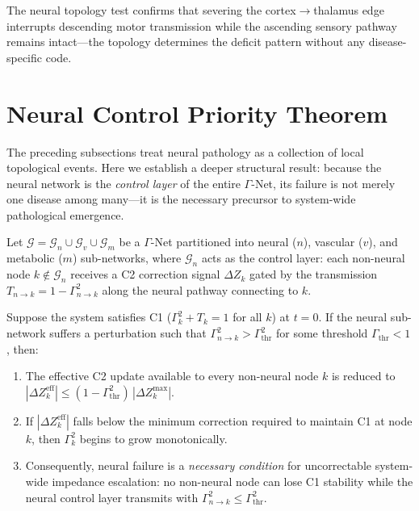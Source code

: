 \documentclass[aps,pre,twocolumn,superscriptaddress,floatfix]{revtex4-2}
\begin{document}
The neural topology test confirms that severing the
cortex$\to$thalamus edge interrupts descending motor
transmission while the ascending sensory pathway
remains intact---the topology determines the deficit
pattern without any disease-specific code.


\section{Neural Control Priority Theorem}
\label{sec:neural-control-priority}

The preceding subsections treat neural pathology as a
collection of local topological events.
Here we establish a deeper structural result: because the
neural network is the \emph{control layer} of the entire
$\Gamma$-Net, its failure is not merely one disease among
many---it is the necessary precursor to system-wide
pathological emergence.

\begin{theorem}
\label{thm:neural-control-priority}
Let $\mathcal{G} = \mathcal{G}_n \cup \mathcal{G}_v \cup
\mathcal{G}_m$ be a $\Gamma$-Net partitioned into neural
($n$), vascular ($v$), and metabolic ($m$) sub-networks,
where $\mathcal{G}_n$ acts as the control layer: each
non-neural node $k \notin \mathcal{G}_n$ receives a
C2 correction signal $\Delta Z_k$ gated by the
transmission $T_{n \to k} = 1 - \Gamma_{n \to k}^2$
along the neural pathway connecting to $k$.

Suppose the system satisfies C1
($\Gamma_k^2 + T_k = 1$ for all $k$) at $t = 0$.
If the neural sub-network suffers a perturbation such
that $\Gamma_{n \to k}^2 > \Gamma_{\mathrm{thr}}^2$ for
some threshold $\Gamma_{\mathrm{thr}} < 1$, then:
\begin{enumerate}
  \item[(i)] The effective C2 update available to every
    non-neural node $k$ is reduced to
    $|\Delta Z_k^{\mathrm{eff}}| \leq
    (1 - \Gamma_{\mathrm{thr}}^2)\,|\Delta Z_k^{\mathrm{max}}|$.
  \item[(ii)] If $|\Delta Z_k^{\mathrm{eff}}|$ falls below
    the minimum correction required to maintain C1 at
    node $k$, then $\Gamma_k^2$ begins to grow
    monotonically.
  \item[(iii)] Consequently, neural failure is a
    \emph{necessary condition} for uncorrectable
    system-wide impedance escalation: no non-neural
    node can lose C1 stability while the neural control
    layer transmits with $\Gamma_{n \to k}^2 \leq
    \Gamma_{\mathrm{thr}}^2$.
\end{enumerate}
\end{theorem}
\end{document}

